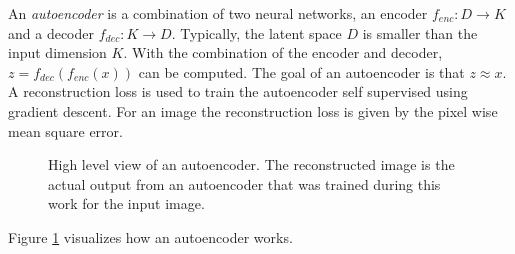 An \emph{autoencoder} is a combination of two neural networks, an encoder $f_{enc}: D \rightarrow K$ and a decoder $f_{dec}: K \rightarrow D$. Typically, the latent space $D$ is smaller than the input dimension $K$. With the combination of the encoder and decoder, $z = f_{dec}(f_{enc}(x))$ can be computed. The goal of an autoencoder is that $z \approx x$. A reconstruction loss is used to train the autoencoder self supervised using gradient descent. For an image the reconstruction loss is given by the pixel wise mean square error.
\begin{figure}[btp]
    \centering
    \caption[High level view of an autoencoder]{High level view of an autoencoder. The reconstructed image is the actual output from an autoencoder that was trained during this work for the input image.}
    \label{fig:ae-explanation}
\end{figure}
Figure \ref{fig:ae-explanation} visualizes how an autoencoder works.

